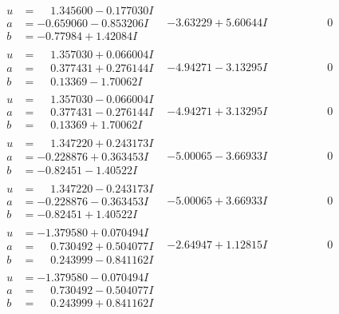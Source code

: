 \documentclass[1p]{elsarticle_modified}
\theoremstyle{definition}
\begin{document}
$$\begin{array}{c|c|c}
\begin{aligned}
u &= \phantom{-}1.345600 - 0.177030 I \\
a &= -0.659060 - 0.853206 I \\
b &= -0.77984 + 1.42084 I\end{aligned}
 & -3.63229 + 5.60644 I & \phantom{-0.000000 } 0 \\ \hline\begin{aligned}
u &= \phantom{-}1.357030 + 0.066004 I \\
a &= \phantom{-}0.377431 + 0.276144 I \\
b &= \phantom{-}0.13369 - 1.70062 I\end{aligned}
 & -4.94271 - 3.13295 I & \phantom{-0.000000 } 0 \\ \hline\begin{aligned}
u &= \phantom{-}1.357030 - 0.066004 I \\
a &= \phantom{-}0.377431 - 0.276144 I \\
b &= \phantom{-}0.13369 + 1.70062 I\end{aligned}
 & -4.94271 + 3.13295 I & \phantom{-0.000000 } 0 \\ \hline\begin{aligned}
u &= \phantom{-}1.347220 + 0.243173 I \\
a &= -0.228876 + 0.363453 I \\
b &= -0.82451 - 1.40522 I\end{aligned}
 & -5.00065 - 3.66933 I & \phantom{-0.000000 } 0 \\ \hline\begin{aligned}
u &= \phantom{-}1.347220 - 0.243173 I \\
a &= -0.228876 - 0.363453 I \\
b &= -0.82451 + 1.40522 I\end{aligned}
 & -5.00065 + 3.66933 I & \phantom{-0.000000 } 0 \\ \hline\begin{aligned}
u &= -1.379580 + 0.070494 I \\
a &= \phantom{-}0.730492 + 0.504077 I \\
b &= \phantom{-}0.243999 - 0.841162 I\end{aligned}
 & -2.64947 + 1.12815 I & \phantom{-0.000000 } 0 \\ \hline\begin{aligned}
u &= -1.379580 - 0.070494 I \\
a &= \phantom{-}0.730492 - 0.504077 I \\
b &= \phantom{-}0.243999 + 0.841162 I\end{aligned}

\end{array}$$
\end{document}
